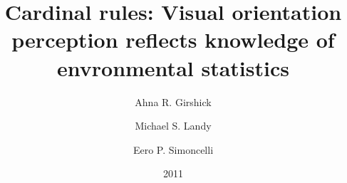 \documentclass[a4paper,12pt]{article}
\title{Cardinal rules: Visual orientation perception reflects knowledge of envronmental statistics}
\author{Ahna R. Girshick \and Michael S. Landy \and Eero P. Simoncelli}
\date{2011}
\begin{document}
{\scshape\bfseries \maketitle}
\end{document}
